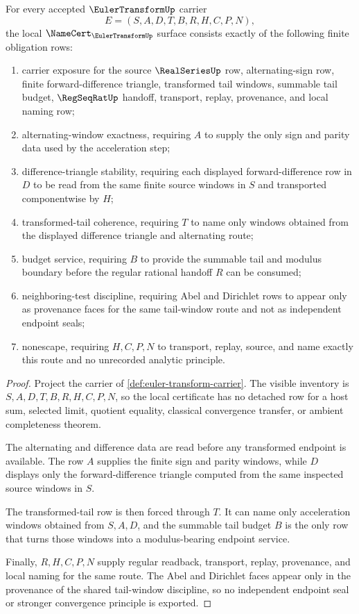 \begin{theorem}\label{thm:euler-transform-namecert-obligations}
For every accepted $\EulerTransformUp$ carrier
$$
E=(S,A,D,T,B,R,H,C,P,N),
$$
the local $\NameCert_{\EulerTransformUp}$ surface consists exactly of the following finite obligation rows:
\begin{enumerate}
\item carrier exposure for the source $\RealSeriesUp$ row, alternating-sign row, finite forward-difference triangle, transformed tail windows, summable tail budget, $\RegSeqRatUp$ handoff, transport, replay, provenance, and local naming row;
\item alternating-window exactness, requiring $A$ to supply the only sign and parity data used by the acceleration step;
\item difference-triangle stability, requiring each displayed forward-difference row in $D$ to be read from the same finite source windows in $S$ and transported componentwise by $H$;
\item transformed-tail coherence, requiring $T$ to name only windows obtained from the displayed difference triangle and alternating route;
\item budget service, requiring $B$ to provide the summable tail and modulus boundary before the regular rational handoff $R$ can be consumed;
\item neighboring-test discipline, requiring Abel and Dirichlet rows to appear only as provenance faces for the same tail-window route and not as independent endpoint seals;
\item nonescape, requiring $H,C,P,N$ to transport, replay, source, and name exactly this route and no unrecorded analytic principle.
\end{enumerate}
\end{theorem}
\begin{proof}
Project the carrier of \autoref{def:euler-transform-carrier}. The visible inventory is $S,A,D,T,B,R,H,C,P,N$, so the local certificate has no detached row for a host sum, selected limit, quotient equality, classical convergence transfer, or ambient completeness theorem.

The alternating and difference data are read before any transformed endpoint is available. The row $A$ supplies the finite sign and parity windows, while $D$ displays only the forward-difference triangle computed from the same inspected source windows in $S$.

The transformed-tail row is then forced through $T$. It can name only acceleration windows obtained from $S,A,D$, and the summable tail budget $B$ is the only row that turns those windows into a modulus-bearing endpoint service.

Finally, $R,H,C,P,N$ supply regular readback, transport, replay, provenance, and local naming for the same route. The Abel and Dirichlet faces appear only in the provenance of the shared tail-window discipline, so no independent endpoint seal or stronger convergence principle is exported.
\end{proof}

